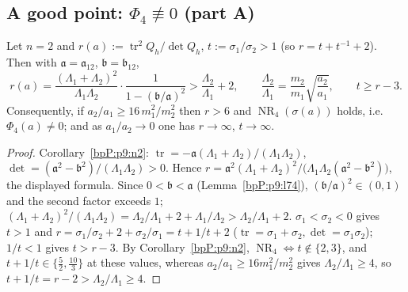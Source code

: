 \subsection{A good point: $\Phi_4\not\equiv0$ (part A)}\label{bpP:p10:sec-good}

\begin{proposition}[The case $n=2$]\label{bpP:p10:n2}
Let $n=2$ and $r(a):=\operatorname{tr}^2Q_h/\det Q_h$, $t:=\sigma_1/\sigma_2>1$ (so $r=t+t^{-1}+2$). Then with $\mathfrak a=\mathfrak a_{12}$, $\mathfrak b=\mathfrak b_{12}$,
\[r(a)=\frac{(\Lambda_1+\Lambda_2)^2}{\Lambda_1\Lambda_2}\cdot\frac1{1-(\mathfrak b/\mathfrak a)^2}>\frac{\Lambda_2}{\Lambda_1}+2,\qquad\frac{\Lambda_2}{\Lambda_1}=\frac{m_2}{m_1}\sqrt{\frac{a_2}{a_1}},\qquad t\ge r-3 .\]
Consequently, if $a_2/a_1\ge16\,m_1^2/m_2^2$ then $r>6$ and $\operatorname{NR}_4(\sigma(a))$ holds, i.e.\ $\Phi_4(a)\ne0$; and as $a_1/a_2\to0$ one has $r\to\infty$, $t\to\infty$.
\end{proposition}
\begin{proof}
\label{stepP:p10:n2-r} Corollary~\ref{bpP:p9:n2}: $\operatorname{tr}=-\mathfrak a(\Lambda_1+\Lambda_2)/(\Lambda_1\Lambda_2)$, $\det=(\mathfrak a^2-\mathfrak b^2)/(\Lambda_1\Lambda_2)>0$. Hence $r=\mathfrak a^2(\Lambda_1+\Lambda_2)^2/\big(\Lambda_1\Lambda_2(\mathfrak a^2-\mathfrak b^2)\big)$, the displayed formula. Since $0<\mathfrak b<\mathfrak a$ (Lemma~\ref{bpP:p9:l74}), $(\mathfrak b/\mathfrak a)^2\in(0,1)$ and the second factor exceeds $1$; $(\Lambda_1+\Lambda_2)^2/(\Lambda_1\Lambda_2)=\Lambda_2/\Lambda_1+2+\Lambda_1/\Lambda_2>\Lambda_2/\Lambda_1+2$.
\label{stepP:p10:n2-t} $\sigma_1<\sigma_2<0$ gives $t>1$ and $r=\sigma_1/\sigma_2+2+\sigma_2/\sigma_1=t+1/t+2$ ($\operatorname{tr}=\sigma_1+\sigma_2,\det=\sigma_1\sigma_2$); $1/t<1$ gives $t>r-3$.
\label{stepP:p10:n2-nr} By Corollary~\ref{bpP:p9:n2}, $\operatorname{NR}_4\iff t\notin\{2,3\}$, and $t+1/t\in\{\frac52,\frac{10}3\}$ at these values, whereas $a_2/a_1\ge16m_1^2/m_2^2$ gives $\Lambda_2/\Lambda_1\ge4$, so $t+1/t=r-2>\Lambda_2/\Lambda_1\ge4$.
\end{proof}


